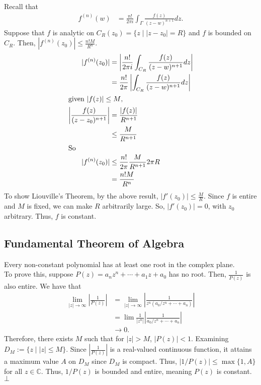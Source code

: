 \documentclass[10pt]{extarticle}
\newcommand{\C}{\mathbb{C}}
\begin{document}
  Recall that
  \begin{align*}
    f^{(n)}(w) &= \frac{n!}{2\pi i}\int_{\Gamma}\frac{f(z)}{(z-w)^{n+1}}dz.
  \end{align*}
  Suppose that $f$ is analytic on $C_{R}(z_0) = \{z\mid |z-z_0| = R\}$ and $f$ is bounded on $C_R$. Then, $|f^{(n)}(z_0)| \leq \frac{n!M}{R^n}$.
  \begin{align*}
    |f^{(n)}(z_0)| &= \left|\frac{n!}{2\pi i}\int_{C_R}\frac{f(z)}{(z-w)^{n+1}}dz\right|\\
                   &= \frac{n!}{2\pi}\left|\int_{C_R}\frac{f(z)}{(z-w)^{n+1}}dz\right|\\
                   \intertext{given $|f(z)| \leq M$,}
    \left|\frac{f(z)}{(z-z_0)^{n+1}}\right| &= \frac{|f(z)|}{R^{n+1}}\\
                                            &\leq \frac{M}{R^{n+1}}\\
                                            \intertext{So}
    |f^{(n)}(z_0)| &\leq \frac{n!}{2\pi}\frac{M}{R^{n+1}}2\pi R\\
                   &= \frac{n!M}{R^{n}}
  \end{align*}
  To show Liouville's Theorem, by the above result, $|f'(z_0)| \leq \frac{M}{R}$. Since $f$ is entire and $M$ is fixed, we can make $R$ arbitrarily large. So, $|f'(z_0)| = 0$, with $z_0$ arbitrary. Thus, $f$ is constant.
  \subsection{Fundamental Theorem of Algebra}%
  Every non-constant polynomial has at least one root in the complex plane.\\

  To prove this, suppose $P(z) = a_nz^n + \cdots + a_1 z + a_0$ has no root. Then, $\frac{1}{P(z)}$ is also entire. We have that
  \begin{align*}
    \lim_{|z|\rightarrow\infty}\left|\frac{1}{P(z)}\right| &= \lim_{|z|\rightarrow\infty}\left|\frac{1}{z^n(a_0/z^n + \cdots + a_n)}\right|\\
                                                           &= \lim \frac{1}{|z^n|} \left|\frac{1}{a_0/z^n + \cdots + a_n}\right|\\
                                                           &\rightarrow 0.
  \end{align*}
  Therefore, there exists $M$ such that for $|z| > M$, $|P(z)| < 1$. Examining $D_M:= \{z\mid |z|\leq M\}$. Since $\left|\frac{1}{P(z)}\right|$ is a real-valued continuous function, it attains a maximum value $A$ on $D_M$ since $D_M$ is compact. Thus, $\left|1/P(z)\right| \leq \max\{1,A\}$ for all $z\in \C$. Thus, $1/P(z)$ is bounded and entire, meaning $P(z)$ is constant. $\bot$
\end{document}
